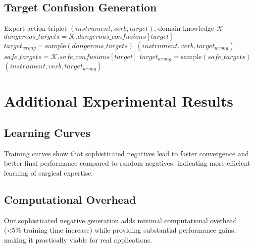 \documentclass[runningheads]{llncs}
\begin{document}
\subsection{Target Confusion Generation}
\begin{algorithmic}[1]
\REQUIRE Expert action triplet $(instrument, verb, target)$, domain knowledge $\mathcal{K}$
\STATE $dangerous\_targets = \mathcal{K}.dangerous\_confusions[target]$
    \STATE $target_{wrong} = \text{sample}(dangerous\_targets)$
    \RETURN $(instrument, verb, target_{wrong})$
\ELSE
    \STATE $safe\_targets = \mathcal{K}.safe\_confusions[target]$ 
    \STATE $target_{wrong} = \text{sample}(safe\_targets)$
    \RETURN $(instrument, verb, target_{wrong})$
\ENDIF
\end{algorithmic}

\section{Additional Experimental Results}

\subsection{Learning Curves}
Training curves show that sophisticated negatives lead to faster convergence and better final performance compared to random negatives, indicating more efficient learning of surgical expertise.

\subsection{Computational Overhead}
Our sophisticated negative generation adds minimal computational overhead (<5\% training time increase) while providing substantial performance gains, making it practically viable for real applications.
\end{document}
